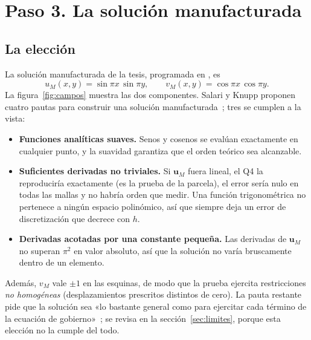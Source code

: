 \documentclass[11pt,a4paper]{article}
\newcommand{\cod}[1]{\path{#1}}  %
\newcommand{\uM}{\bm{u}_M}
\begin{document}
\section{Paso 3. La solución manufacturada}\label{sec:paso3}

\subsection{La elección}

La solución manufacturada de la tesis, programada en \cod{tests/vv_mms.py}, es
\begin{equation}\label{eq:uM}
  u_M(x,y) = \sin\pi x\,\sin\pi y, \qquad v_M(x,y) = \cos\pi x\,\cos\pi y .
\end{equation}
La figura~\ref{fig:campos} muestra las dos componentes. Salari y Knupp proponen cuatro pautas para
construir una solución manufacturada~\cite[p.~23]{salari}; tres se cumplen a la vista:

\begin{itemize}[leftmargin=1.2em]
  \item \textbf{Funciones analíticas suaves.} Senos y cosenos se evalúan exactamente en cualquier
    punto, y la suavidad garantiza que el orden teórico sea alcanzable.
  \item \textbf{Suficientes derivadas no triviales.} Si $\uM$ fuera lineal, el Q4 la reproduciría
    exactamente (es la prueba de la parcela), el error sería nulo en todas las mallas y no habría
    orden que medir. Una función trigonométrica no pertenece a ningún espacio polinómico, así que
    siempre deja un error de discretización que decrece con $h$.
  \item \textbf{Derivadas acotadas por una constante pequeña.} Las derivadas de $\uM$ no superan
    $\pi^2$ en valor absoluto, así que la solución no varía bruscamente dentro de un elemento.
\end{itemize}

Además, $v_M$ vale $\pm1$ en las esquinas, de modo que la prueba ejercita restricciones
\emph{no homogéneas} (desplazamientos prescritos distintos de cero). La pauta restante pide que la
solución sea «lo bastante general como para ejercitar cada término de la ecuación de
gobierno»~\cite[p.~23]{salari}; se revisa en la sección~\ref{sec:limites}, porque esta elección no
la cumple del todo.
\end{document}

